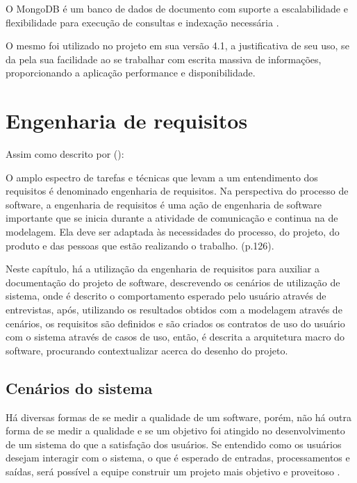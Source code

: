 O MongoDB é um banco de dados de documento com suporte a escalabilidade e flexibilidade para execução de consultas e indexação necessária \cite{what_mongodb}.

O mesmo foi utilizado no projeto em sua versão 4.1, a justificativa de seu uso, se da pela sua facilidade ao se trabalhar com escrita massiva de informações, proporcionando a aplicação performance e disponibilidade.

\section{Engenharia de requisitos}

Assim como descrito por  (\citeyear{engenharia_software_pressman}):

\begin{citacao}
O amplo espectro de tarefas e técnicas que levam a um entendimento dos requisitos é denominado engenharia de requisitos. Na perspectiva do processo de software, a engenharia de requisitos é uma ação de engenharia de software importante que se inicia durante a atividade de comunicação e continua na de modelagem. Ela deve ser adaptada às necessidades do processo, do projeto, do produto e das pessoas que estão realizando o trabalho. (p.126).
\end{citacao}

Neste capítulo, há a utilização da engenharia de requisitos para auxiliar a documentação do projeto de software, descrevendo os cenários de utilização de sistema, onde é descrito o comportamento esperado pelo usuário através de entrevistas, após, utilizando os resultados obtidos com a modelagem através de cenários, os requisitos são definidos e são criados os contratos de uso do usuário com o sistema através de casos de uso, então, é descrita a arquitetura macro do software, procurando contextualizar acerca do desenho do projeto.

\subsection{Cenários do sistema}

Há diversas formas de se medir a qualidade de um software, porém, não há outra forma de se medir a qualidade e se um objetivo foi atingido no desenvolvimento de um sistema do que a satisfação dos usuários. Se entendido como os usuários desejam interagir com o sistema, o que é esperado de entradas, processamentos e saídas, será possível a equipe construir um projeto mais objetivo e proveitoso \cite{engenharia_software_pressman}. 

